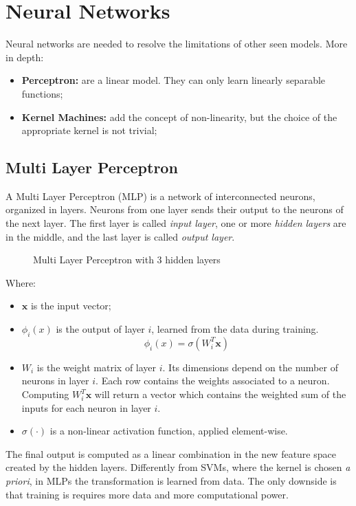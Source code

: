 \section{Neural Networks}
Neural networks are needed to resolve the limitations of other seen models. More in depth:
\begin{itemize}
    \item \textbf{Perceptron:} are a linear model. They can only learn linearly separable functions;
    \item \textbf{Kernel Machines:} add the concept of non-linearity, but the choice of the appropriate kernel is not trivial;
\end{itemize}
\subsection{Multi Layer Perceptron}
A Multi Layer Perceptron (MLP) is a network of interconnected neurons, organized in layers. Neurons from one layer
sends their output to the neurons of the next layer. The first layer is called \textit{input layer}, one or more \textit{hidden layers}
are in the middle, and the last layer is called \textit{output layer}.

\begin{figure}[H]
  \centering
  \caption{Multi Layer Perceptron with 3 hidden layers}
\end{figure}

Where:
\begin{itemize}
    \item $\boldsymbol{x}$ is the input vector;
    \item $\phi_i(x)$ is the output of layer $i$, learned from the data during training.
    \[\phi_i(x) = \sigma(W_i^T \boldsymbol{x})\]
    \item $W_i$ is the weight matrix of layer $i$. Its dimensions depend on the number of neurons in layer $i$. 
    Each row contains the weights associated to a neuron. Computing $W_i^T \boldsymbol{x}$ will return a vector
    which contains the weighted sum of the inputs for each neuron in layer $i$.
    \item $\sigma(\cdot)$ is a non-linear activation function, applied element-wise.
\end{itemize}
The final output is computed as a linear combination in the new feature space created by the hidden layers.
Differently from SVMs, where the kernel is chosen \textit{a priori}, in MLPs the transformation is learned from data. The only
downside is that training is requires more data and more computational power.
